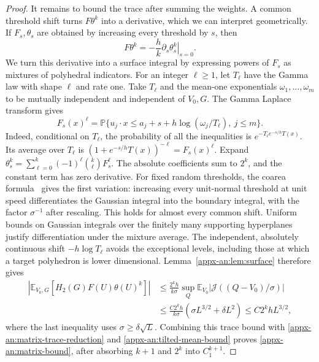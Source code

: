 \documentclass[11pt,letterpaper]{article}
\theoremstyle{remark}
\newcommand{\E}{\mathbb E}
\newcommand{\Pp}{\mathbb P}
\newcommand{\surf}{\mathcal J}
\begin{document}
\begin{proof}
It remains to bound the trace after summing the weights. A common
threshold shift turns \(F\theta^k\) into a derivative, which we can
interpret geometrically. If \(F_s,\theta_s\) are obtained by increasing
every threshold by \(s\), then
\[
 F\theta^k=-\frac hk\left.\partial_s\theta_s^k\right|_{s=0}.
\]
We turn this derivative into a surface integral by expressing powers
of \(F_s\) as mixtures of polyhedral indicators. For an integer
\(\ell\ge1\), let \(T_\ell\) have the Gamma law with shape \(\ell\)
and rate one. Take \(T_\ell\) and the mean-one exponentials
\(\omega_1,\ldots,\omega_m\) to be mutually independent and
independent of \(V_0,G\). The Gamma Laplace transform gives
\begin{equation}
 F_s(x)^\ell=\Pp\{u_j\cdot x\le
        a_j+s+h\log(\omega_j/T_\ell),\ j\le m\}.
 \label{appx-an:gamma-mixture}
\end{equation}
Indeed, conditional on \(T_\ell\), the probability of all the
inequalities is \(e^{-T_\ell e^{-s/h}T(x)}\). Its average over
\(T_\ell\) is \((1+e^{-s/h}T(x))^{-\ell}=F_s(x)^\ell\).
Expand \(\theta_s^k=\sum_{\ell=0}^k(-1)^\ell\binom k\ell  F_s^\ell\).
The absolute coefficients sum to \(2^k\), and the constant term has
zero derivative. For fixed random thresholds, the coarea
formula~\cite[Section~3.4]{EvansGariepy2015} gives the first variation:
increasing every unit-normal threshold at unit speed differentiates
the Gaussian integral into the boundary integral, with the factor
\(\sigma^{-1}\) after rescaling. This holds for almost every common
shift. Uniform bounds on Gaussian integrals over the finitely many
supporting hyperplanes justify differentiation under the mixture
average. The independent, absolutely continuous shift \(-h\log T_\ell\)
avoids the exceptional levels, including those at which a target
polyhedron is lower dimensional. Lemma~\ref{appx-an:lem:surface}
therefore gives
\begin{align*}
 \left|\E_{V_0,G}[H_2(G)F(U)\theta(U)^k]\right|
 &\le\frac{2^kh}{k\sigma}
       \sup_Q\E_{V_0}|\surf((Q-V_0)/\sigma)|\\
 &\le\frac{C2^kh}{k\sigma}
       (\sigma L^{3/2}+\delta L^2)
 \le C2^khL^{3/2},
\end{align*}
where the last inequality uses \(\sigma\ge\delta\sqrt L\).
Combining this trace bound with
\eqref{appx-an:matrix-trace-reduction} and
\eqref{appx-an:tilted-mean-bound} proves
\eqref{appx-an:matrix-bound}, after absorbing \(k+1\) and \(2^k\)
into \(C_1^{k+1}\).
\end{proof}
\end{document}
